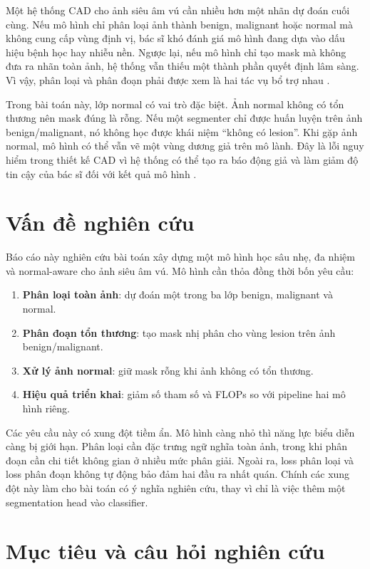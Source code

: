 \documentclass[12pt,a4paper,oneside]{report}
\begin{document}
Một hệ thống CAD cho ảnh siêu âm vú cần nhiều hơn một nhãn dự đoán cuối cùng. Nếu mô hình chỉ phân loại ảnh thành benign, malignant hoặc normal mà không cung cấp vùng định vị, bác sĩ khó đánh giá mô hình đang dựa vào dấu hiệu bệnh học hay nhiễu nền. Ngược lại, nếu mô hình chỉ tạo mask mà không đưa ra nhãn toàn ảnh, hệ thống vẫn thiếu một thành phần quyết định lâm sàng. Vì vậy, phân loại và phân đoạn phải được xem là hai tác vụ bổ trợ nhau \citep{zhou,aumente,damknet}.

Trong bài toán này, lớp normal có vai trò đặc biệt. Ảnh normal không có tổn thương nên mask đúng là rỗng. Nếu một segmenter chỉ được huấn luyện trên ảnh benign/malignant, nó không học được khái niệm ``không có lesion''. Khi gặp ảnh normal, mô hình có thể vẫn vẽ một vùng dương giả trên mô lành. Đây là lỗi nguy hiểm trong thiết kế CAD vì hệ thống có thể tạo ra báo động giả và làm giảm độ tin cậy của bác sĩ đối với kết quả mô hình \citep{busi,aumente,damknet}.

\section{Vấn đề nghiên cứu}

Báo cáo này nghiên cứu bài toán xây dựng một mô hình học sâu nhẹ, đa nhiệm và normal-aware cho ảnh siêu âm vú. Mô hình cần thỏa đồng thời bốn yêu cầu:

\begin{enumerate}
  \item \textbf{Phân loại toàn ảnh}: dự đoán một trong ba lớp benign, malignant và normal.
  \item \textbf{Phân đoạn tổn thương}: tạo mask nhị phân cho vùng lesion trên ảnh benign/malignant.
  \item \textbf{Xử lý ảnh normal}: giữ mask rỗng khi ảnh không có tổn thương.
  \item \textbf{Hiệu quả triển khai}: giảm số tham số và FLOPs so với pipeline hai mô hình riêng.
\end{enumerate}

Các yêu cầu này có xung đột tiềm ẩn. Mô hình càng nhỏ thì năng lực biểu diễn càng bị giới hạn. Phân loại cần đặc trưng ngữ nghĩa toàn ảnh, trong khi phân đoạn cần chi tiết không gian ở nhiều mức phân giải. Ngoài ra, loss phân loại và loss phân đoạn không tự động bảo đảm hai đầu ra nhất quán. Chính các xung đột này làm cho bài toán có ý nghĩa nghiên cứu, thay vì chỉ là việc thêm một segmentation head vào classifier.

\section{Mục tiêu và câu hỏi nghiên cứu}
\end{document}
